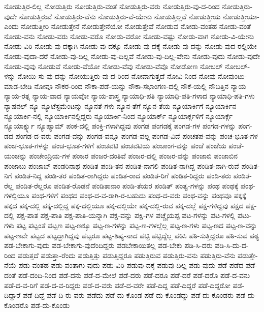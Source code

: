 {ನೋಡುತ್ತಿರ-ಲಿಲ್ಲ
ನೋಡುತ್ತಿರು
ನೋಡುತ್ತಿರು-ವಂತೆ
ನೋಡುತ್ತಿರು-ವರು
ನೋಡುತ್ತಿರು-ವು-ದ-ರಿಂದ
ನೋಡುತ್ತಿರು-ವುದೇ
ನೋಡುತ್ತಿರುವೆ
ನೋಡುತ್ತಿರು-ವೆನು
ನೋಡುತ್ತಿರು-ವೆ-ಯೇನು
ನೋಡುತ್ತಿಲ್ಲವೆ
ನೋಡುತ್ತೀಯ
ನೋಡುತ್ತೀಯಾ-ಎಂದು
ನೋಡುತ್ತೀರಿ
ನೋಡುತ್ತೇನೆ
ನೋಡುತ್ತೇನೆಯೋ
ನೋಡುತ್ತೇವೆ
ನೋಡುವ
ನೋಡು-ವಂತಹ
ನೋಡು-ವಂತೆ
ನೋಡು-ವನು
ನೋಡು-ವರು
ನೋಡು-ವರೊ
ನೋಡು-ವರೋ
ನೋಡು-ವಷ್ಟು
ನೋಡು-ವಾಗ
ನೋಡು-ವಿ-ಯೇನು
ನೋಡು-ವಿರಿ
ನೋಡು-ವು-ದಕ್ಕಾಗಿ
ನೋಡು-ವು-ದಕ್ಕೂ
ನೋಡು-ವು-ದಕ್ಕೆ
ನೋಡು-ವು-ದನ್ನು
ನೋಡು-ವುದ-ರಲ್ಲಿಯೇ
ನೋಡು-ವುದಾ-ದರೆ
ನೋಡು-ವು-ದಿಲ್ಲ
ನೋಡು-ವು-ದಿಲ್ಲವೆ
ನೋಡು-ವು-ದಿಲ್ಲ-ವೇನು
ನೋಡು-ವುದು
ನೋಡು-ವುದೇ
ನೋಡು-ವುವು
ನೋಡುವೆ
ನೋಡು-ವೆಯೋ
ನೋಡು-ವೆವು
ನೋಡು-ವೆವೊ
ನೋಡೋಣ
ನೋಬಲ್
ನೋಬಲ್-ಳನ್ನು
ನೋಯಿ-ಸು-ವು-ದನ್ನು
ನೋಯುತ್ತಿರು-ವು-ದ-ರಿಂದ
ನೋವಾಗುತ್ತದೆ
ನೋವಿ-ನಿಂದ
ನೋವು
ನೋವುಂಟು-ಮಾಡ-ಬೇಡಿ
ನೋವೂ
ನೌಕರ-ರಿಂದ
ನೌಕಾ-ಪಡೆ-ಯನ್ನು
ನೌಕಾ-ಸಭಾಂಗಣ-ದಲ್ಲಿ
ನೌಕೆ-ಯಲ್ಲಿ
ನೌಬತ್ತಿನ
ನ್ಯಾಯ
ನ್ಯಾಯ-ರತ್ನ
ನ್ಯಾಯ-ವಾದ
ನ್ಯಾಯವೋ
ನ್ಯಾಯ-ಶಾಸ್ತ್ರ
ನ್ಯಾಯಾಧಿ-ಪತಿ
ನ್ಯಾಯಾಧಿ-ಪತಿ-ಗಳಾದ
ನ್ಯಾಯಾಧಿ-ಪತಿ-ಗಳು
ನ್ಯಾಷನಲ್
ನ್ಯೂ
ನ್ಯೂಟೆಸ್ಟಮೆಂಟನ್ನು
ನ್ಯೂನತೆ-ಗಳು
ನ್ಯೂನ-ತೆಗೆ
ನ್ಯೂನ-ತೆಯ
ನ್ಯೂಯಾರ್ಕಿಗೆ
ನ್ಯೂಯಾರ್ಕಿನ
ನ್ಯೂಯಾರ್ಕಿ-ನಲ್ಲಿ
ನ್ಯೂಯಾರ್ಕಿನಲ್ಲಿದ್ದರು
ನ್ಯೂಯಾರ್ಕಿ-ನಿಂದ
ನ್ಯೂಯಾರ್ಕ್
ನ್ಯೂಯಾರ್ಕ್ಗಳಿಗೆ
ನ್ಯೂಯಾರ್ಕ್ಗೆ
ನ್ಯೂಯಾರ್ಕ್ನ್ನು
ನ್ಯೂಹ್ಯಾಮ್
ಪಂಕ-ದಲ್ಲಿ
ಪಂಕ್ತಿ-ಗಳಾಗಿದ್ದವು
ಪಂಗಡ
ಪಂಗಡಕ್ಕೆ
ಪಂಗಡ-ಗಳ
ಪಂಗಡ-ಗಳನ್ನು
ಪಂಗ-ಡದ
ಪಂಗಡ-ದ-ವರು
ಪಂಗಡ-ವನ್ನು
ಪಂಗಡ-ವನ್ನೂ
ಪಂಗಡ-ವಲ್ಲ
ಪಂಗಡ-ವಿದೆ
ಪಂಚತಪ-ವನ್ನು
ಪಂಚ-ಭೂತ-ಗಳ
ಪಂಚ-ಭೂತ-ಗಳನ್ನು
ಪಂಚ-ಭೂತ-ಗಳಿಗೆ
ಪಂಚವಟಿ
ಪಂಚವಟಿಯ
ಪಂಚಾಂಗ-ವನ್ನು
ಪಂಚೆ
ಪಂಚೆಯ
ಪಂಚೆ-ಯಂಚನ್ನು
ಪಂಚೇಂದ್ರಿಯ-ಗಳ
ಪಂಜರ
ಪಂಜರ-ದಂತಿವೆ
ಪಂಜರ-ದಲ್ಲಿ
ಪಂಜರ-ವನ್ನು
ಪಂಜಾಬಿ
ಪಂಜಾಬಿನ
ಪಂಜಾಬು
ಪಂಜಾಬ್
ಪಂಡರಿನಾಥ
ಪಂಡಿತ
ಪಂಡಿ-ತನ
ಪಂಡಿತ-ನಾಗಲಿ
ಪಂಡಿತ-ನಾಗಿದ್ದ
ಪಂಡಿತ-ನಾಗಿ-ರುವೆ
ಪಂಡಿತ-ನಿಗೆ
ಪಂಡಿತ-ನಿದ್ದ
ಪಂಡಿ-ತರ
ಪಂಡಿತ-ರಾಗಿದ್ದರು
ಪಂಡಿತ-ರಾದ
ಪಂಡಿತ-ರಿಗೆ
ಪಂಡಿತ-ರಿದ್ದರು
ಪಂಡಿ-ತರು
ಪಂಡಿತ-ರೆಲ್ಲ
ಪಂಡಿತ-ರೆಲ್ಲರೂ
ಪಂಡಿತ-ರೊಡನೆ
ಪಂಡಿತಾನಾಂ
ಪಂಡಿ-ತೆಯರ
ಪಂಡಿತ್
ಪಂತ್ವ-ಗಳನ್ನು
ಪಂಥ
ಪಂಥಕ್ಕೆ
ಪಂಥ-ಗಳಲ್ಲಿಯೂ
ಪಂಥ-ಗಳಿಗೆ
ಪಂಥದ
ಪಂಥ-ದ-ವ-ರಾಗಿ-ರ-ಬಹುದು
ಪಂಥ-ದ-ವರು
ಪಂಥ-ವನ್ನು
ಪಂಥವೂ
ಪಕ್ಕಕ್ಕೆ
ಪಕ್ಕದ
ಪಕ್ಕ-ದಲ್ಲಿ
ಪಕ್ಕ-ದಲ್ಲಿದ್ದ
ಪಕ್ಕ-ದಲ್ಲಿಯೂ
ಪಕ್ಕ-ದಲ್ಲಿಯೇ
ಪಕ್ಕ-ದಲ್ಲಿ-ರುವ
ಪಕ್ಕ-ದಲ್ಲೆ
ಪಕ್ಷ-ಗಳಿದ್ದವು
ಪಕ್ಷದ
ಪಕ್ಷ-ದಲ್ಲಿ
ಪಕ್ಷ-ಪಾತ
ಪಕ್ಷ-ಪಾತಿ
ಪಕ್ಷ-ಪಾತಿ-ಯನ್ನಾಗಿ
ಪಕ್ಷ-ವನ್ನು
ಪಕ್ಷಿ-ಗಳ
ಪಚ್ಚೈಯಪ್ಪ
ಪಟ-ಗಳನ್ನು
ಪಟ-ಗಳಲ್ಲಿ
ಪಟು-ಗಳು
ಪಟ್ಟ
ಪಟ್ಟಂತೆ
ಪಟ್ಟಣ
ಪಟ್ಟ-ಣಕ್ಕೂ
ಪಟ್ಟ-ಣ-ಗಳನ್ನು
ಪಟ್ಟ-ಣ-ಗಳಲ್ಲೆಲ್ಲ
ಪಟ್ಟ-ಣ-ಗಳು
ಪಟ್ಟ-ಣದ
ಪಟ್ಟ-ಣ-ವನ್ನು
ಪಟ್ಟ-ಣವೇ
ಪಟ್ಟದ
ಪಟ್ಟದ್ದಾಗಿದ್ದವು
ಪಟ್ಟರೂ
ಪಟ್ಟ-ಶಿಷ್ಯ-ನಾದ
ಪಟ್ಟಿ
ಪಟ್ಟಿದ್ದೆಲ್ಲ
ಪಠಿಸಿ
ಪಠಿ-ಸುತ್ತಿದ್ದರೂ
ಪಠಿ-ಸುವ
ಪಠ್ಯ
ಪಡ-ಬೇಕಾಗು-ವುದು
ಪಡ-ಬೇಕಾಗು-ವುದೆಂದಿದ್ದರು
ಪಡಬೇಕಾಯಿತಲ್ಲ
ಪಡ-ಬೇಕು
ಪಡಿ-ಸಿ-ದರು
ಪಡಿ-ಸಿ-ದು-ದ-ರಿಂದ
ಪಡುತ್ತದೆ
ಪಡುತ್ತಾ-ರೆಂದು
ಪಡುತ್ತಿತ್ತು
ಪಡುತ್ತಿದ್ದರೂ
ಪಡುತ್ತಿರುವ
ಪಡುತ್ತಿರು-ವನು
ಪಡುತ್ತಿರು-ವೆನು
ಪಡುತ್ತೇ-ನೆಯೆ
ಪಡು-ವಂತಹ
ಪಡು-ವಂತಾಗು-ವುದು
ಪಡು-ವಿರಿ
ಪಡುವು-ದಕ್ಕೆ
ಪಡುವು-ದಿಲ್ಲ
ಪಡು-ವುದು
ಪಡೆ
ಪಡೆದ
ಪಡೆ-ದಂತೆ
ಪಡೆ-ದಂದಿ-ನಿಂದ
ಪಡೆ-ದನು
ಪಡೆ-ದ-ಮೇಲೆ
ಪಡೆ-ದರು
ಪಡೆ-ದರೂ
ಪಡೆ-ದರೆ
ಪಡೆ-ದರೊ
ಪಡೆ-ದ-ವನು
ಪಡೆ-ದ-ವ-ರಿಗೆ
ಪಡೆ-ದ-ವ-ರಿದ್ದರು
ಪಡೆ-ದ-ವರು
ಪಡೆ-ದ-ವರೇ
ಪಡೆ-ದಿದ್ದ
ಪಡೆ-ದಿದ್ದರೆ
ಪಡೆ-ದಿದ್ದರೋ
ಪಡೆ-ದಿದ್ದಾರೆ
ಪಡೆ-ದಿದ್ದೆ
ಪಡೆ-ದಿ-ರು-ವರು
ಪಡೆದು
ಪಡೆ-ದು-ಕೊಂಡ
ಪಡೆ-ದು-ಕೊಂಡದ್ದು
ಪಡೆ-ದು-ಕೊಂಡರು
ಪಡೆ-ದು-ಕೊಂಡರೊ
ಪಡೆ-ದು-ಕೊಂಡು
}
